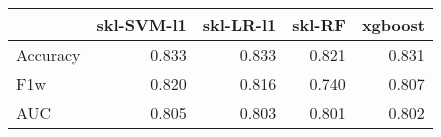 \begin{tabular}{lrrrr}
\toprule
{} &  skl-SVM-l1 &  skl-LR-l1 &  skl-RF &  xgboost \\
\midrule
Accuracy &       0.833 &      0.833 &   0.821 &    0.831 \\
F1w      &       0.820 &      0.816 &   0.740 &    0.807 \\
AUC      &       0.805 &      0.803 &   0.801 &    0.802 \\
\bottomrule
\end{tabular}
